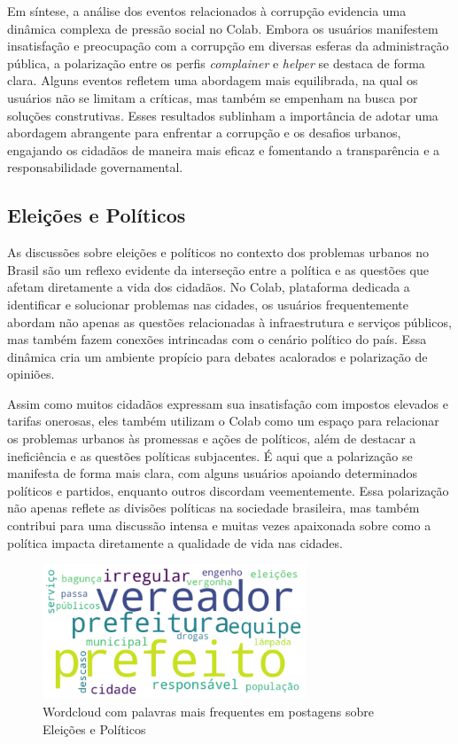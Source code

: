 Em síntese, a análise dos eventos relacionados à corrupção evidencia uma dinâmica complexa de pressão social no Colab. Embora os usuários manifestem insatisfação e preocupação com a corrupção em diversas esferas da administração pública, a polarização entre os perfis \textit{complainer} e \textit{helper} se destaca de forma clara. Alguns eventos refletem uma abordagem mais equilibrada, na qual os usuários não se limitam a críticas, mas também se empenham na busca por soluções construtivas. Esses resultados sublinham a importância de adotar uma abordagem abrangente para enfrentar a corrupção e os desafios urbanos, engajando os cidadãos de maneira mais eficaz e fomentando a transparência e a responsabilidade governamental.

\subsection{Eleições e Políticos}

As discussões sobre eleições e políticos no contexto dos problemas urbanos no Brasil são um reflexo evidente da interseção entre a política e as questões que afetam diretamente a vida dos cidadãos. No Colab, plataforma dedicada a identificar e solucionar problemas nas cidades, os usuários frequentemente abordam não apenas as questões relacionadas à infraestrutura e serviços públicos, mas também fazem conexões intrincadas com o cenário político do país. Essa dinâmica cria um ambiente propício para debates acalorados e polarização de opiniões.

Assim como muitos cidadãos expressam sua insatisfação com impostos elevados e tarifas onerosas, eles também utilizam o Colab como um espaço para relacionar os problemas urbanos às promessas e ações de políticos, além de destacar a ineficiência e as questões políticas subjacentes. É aqui que a polarização se manifesta de forma mais clara, com alguns usuários apoiando determinados políticos e partidos, enquanto outros discordam veementemente. Essa polarização não apenas reflete as divisões políticas na sociedade brasileira, mas também contribui para uma discussão intensa e muitas vezes apaixonada sobre como a política impacta diretamente a qualidade de vida nas cidades.

\begin{figure}[htb]
	\centering
	\includegraphics[width=0.7\textwidth]{images/wordcloud_polititians.png}
	\caption{Wordcloud com palavras mais frequentes em postagens sobre Eleições e Políticos}
	\label{fig:wordcloud_polititians}
\end{figure}

